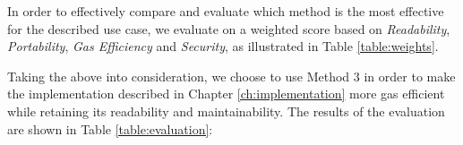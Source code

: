 

In order to effectively compare and evaluate which method is the most effective for the described use case, we evaluate on a weighted score based on \textit{Readability}, \textit{Portability}, \textit{Gas Efficiency} and \textit{Security}, as illustrated in Table \ref{table:weights}.



Taking the above into consideration, we choose to use Method 3 in order to make the implementation described in Chapter \ref{ch:implementation} more gas efficient while retaining its readability and maintainability. The results of the evaluation are shown in Table \ref{table:evaluation}:






